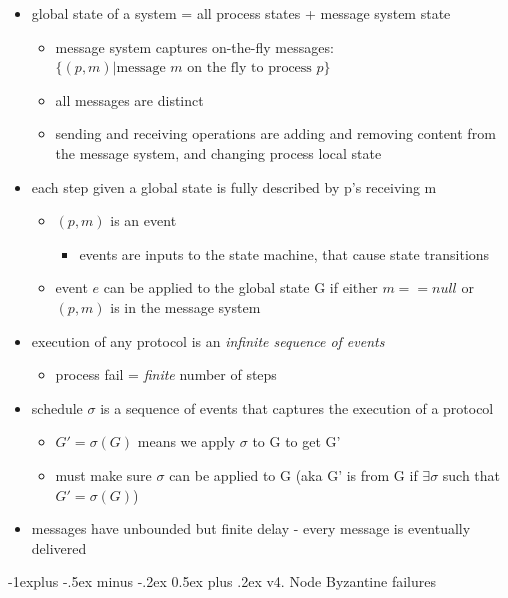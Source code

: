 \documentclass[10pt, landscape]{article}
\makeatletter
\renewcommand{\subsection}{\@startsection{subsection}{2}{0mm}%
  {-1explus -.5ex minus -.2ex}%
  {0.5ex plus .2ex}%
{\normalfont\normalsize\bfseries}}
\makeatother
\begin{document}
\begin{multicols*}{3}
  \begin{itemize}
    \item global state of a system = all process states + message system state
      \begin{itemize}
        \item message system captures on-the-fly messages: $\{(p, m) \vert \text{message $m$ on the fly to process $p$}\}$
        \item all messages are distinct
        \item sending and receiving operations are adding and removing content from the message system, and changing process local state
      \end{itemize}
    \item each step given a global state is fully described by p’s receiving m
      \begin{itemize}
        \item $(p, m)$ is an event
          \begin{itemize}
            \item events are inputs to the state machine, that cause state transitions
          \end{itemize}
        \item event $e$ can be applied to the global state G if either $m==null$ or $(p, m)$ is in the message system
      \end{itemize}
    \item execution of any protocol is an \textit{infinite sequence of events}
      \begin{itemize}
        \item process fail = \textit{finite} number of steps
      \end{itemize}
    \item schedule $\sigma$ is a sequence of events that captures the execution of a protocol
      \begin{itemize}
        \item $G'=\sigma(G)$ means we apply $\sigma$ to G to get G’
        \item must make sure $\sigma$ can be applied to G (aka G’ is  from G if $\exists \sigma$ such that $G'=\sigma(G)$)
      \end{itemize}
    \item messages have unbounded but finite delay - every message is eventually delivered
  \end{itemize}

  \subsection{v4. Node Byzantine failures}


\end{multicols*}
\end{document}
